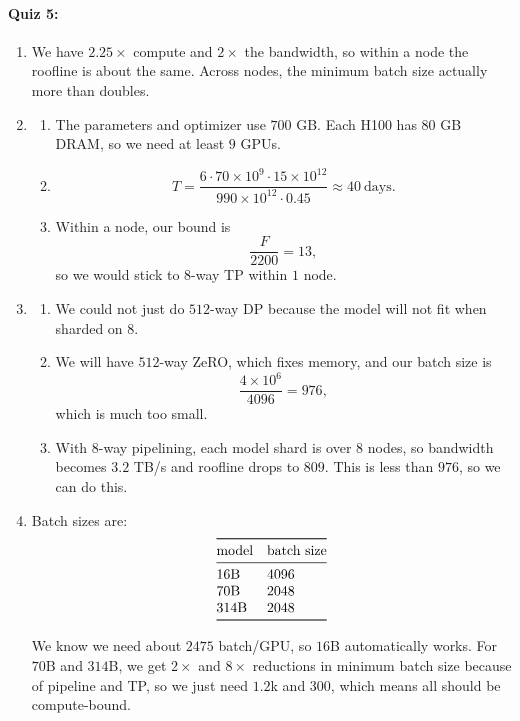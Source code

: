 \documentclass[11pt]{article}
\newcommand{\F}{F}
\newcommand{\quizbreak}{\Needspace{6\baselineskip}}
\begin{document}
\quizbreak
\paragraph{Quiz 5:}
\begin{enumerate}
  \item We have $2.25\times$ compute and $2\times$ the bandwidth, so within a node the roofline is about the same. Across nodes, the minimum batch size actually more than doubles.

  \item
  \begin{enumerate}
    \item The parameters and optimizer use $700$ GB. Each H100 has $80$ GB DRAM, so we need at least $9$ GPUs.

    \item
    \[
      T=
      \frac{6\cdot 70\times 10^9\cdot 15\times 10^{12}}
           {990\times 10^{12}\cdot 0.45}
      \approx 40\ \mathrm{days}.
    \]

    \item Within a node, our bound is
    \[
      \frac{\F}{2200}=13,
    \]
    so we would stick to $8$-way TP within $1$ node.
  \end{enumerate}

  \item
  \begin{enumerate}
    \item We could not just do $512$-way DP because the model will not fit when sharded on $8$.

    \item We will have $512$-way ZeRO, which fixes memory, and our batch size is
    \[
      \frac{4\times 10^6}{4096}=976,
    \]
    which is much too small.

    \item With $8$-way pipelining, each model shard is over $8$ nodes, so bandwidth becomes $3.2$ TB/s and roofline drops to $809$. This is less than $976$, so we can do this.
  \end{enumerate}

  \item Batch sizes are:
  \[
  \begin{array}{@{}ll@{}}
  \toprule
  \text{model} & \text{batch size} \\
  \midrule
  16\mathrm{B} & 4096 \\
  70\mathrm{B} & 2048 \\
  314\mathrm{B} & 2048 \\
  \bottomrule
  \end{array}
  \]

  We know we need about $2475$ batch/GPU, so $16$B automatically works. For $70$B and $314$B, we get $2\times$ and $8\times$ reductions in minimum batch size because of pipeline and TP, so we just need $1.2$k and $300$, which means all should be compute-bound.
\end{enumerate}
\end{document}
